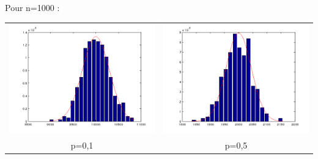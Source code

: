 \documentclass{article}
\begin{document}
\newpage
Pour n=1000 : \\
\begin{tabular}{c c}
	\includegraphics[scale=0.5]{graph/n1000p1.png} & 
	\includegraphics[scale=0.5]{graph/n1000p5.png} \\
	p=0,1 &	p=0,5
\end{tabular}\\
\end{document}
